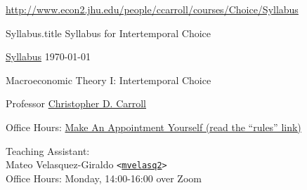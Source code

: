 \documentclass{\econtex}\newcommand{\texname}{Syllabus}
\begin{document}
\large
\begin{center}{{\tiny \url{http://www.econ2.jhu.edu/people/ccarroll/courses/Choice/Syllabus}}}\end{center}


\begin{verbatimwrite}{\texname.title}
Syllabus for Intertemporal Choice
\end{verbatimwrite}

\thispagestyle{empty}

\newenvironment{blockpar}{\par\begin{minipage}{\textwidth}
\setlength{\parskip}{.5\baselineskip plus 1pt minus 1pt}}{\end{minipage}}

\pagestyle{plain}
\thispagestyle{empty}

\begin{center}
{\tiny \href{http://www.econ2.jhu.edu/people/ccarroll/courses/Choice/Syllabus.pdf}{\texname} \hfill \today}


{\LARGE Macroeconomic Theory I: Intertemporal Choice}
\medskip\medskip
\medskip\medskip

\smallskip


Professor \href{http://www.econ2.jhu.edu/people/ccarroll}{Christopher D. Carroll}

\medskip

\medskip\medskip
Office Hours: \href{https://calendar.google.com/calendar/selfsched?sstoken=UUNxMjFfNUtvakNSfGRlZmF1bHR8NjZhZDA0NmI3YmE5N2Y5N2Y3YjE2MzI5ZDg5YTYwYjQ}{Make An Appointment Yourself (read the ``rules'' link)}

\medskip\medskip\medskip
\small
Teaching Assistant:  \\
Mateo Velasquez-Giraldo \texttt{<\href{mailto:mvelasq2}{\texttt{mvelasq2}}>}
\\ Office Hours: Monday, 14:00-16:00 over Zoom
\normalsize
\medskip

\end{center}
\end{document}

